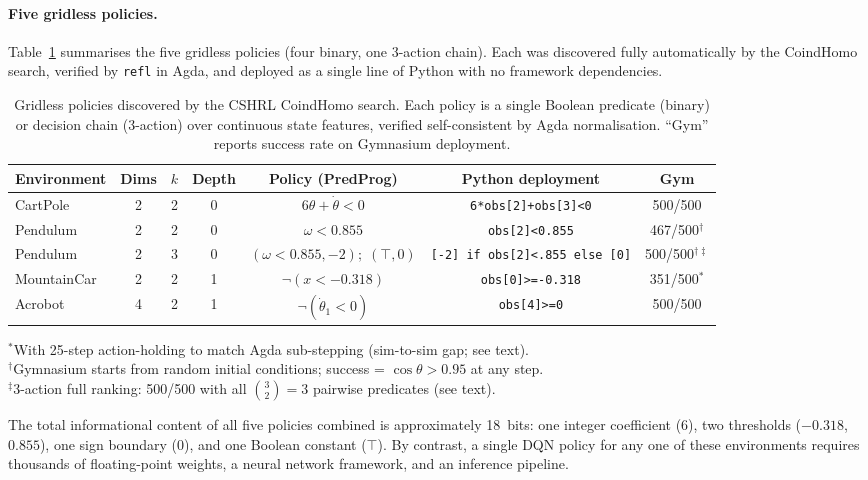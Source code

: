 \documentclass[9pt,a4paper]{article}
\theoremstyle{plain}
\theoremstyle{definition}
\theoremstyle{remark}
\begin{document}
\paragraph{Five gridless policies.}
Table~\ref{tab:gridless-policies} summarises the five gridless policies (four binary, one 3-action chain).  Each was discovered fully automatically by the CoindHomo search, verified by \texttt{refl} in Agda, and deployed as a single line of Python with no framework dependencies.

\begin{table}[h]
\centering
\small
\caption{Gridless policies discovered by the CSHRL CoindHomo search.  Each policy is a single Boolean predicate (binary) or decision chain (3-action) over continuous state features, verified self-consistent by Agda normalisation.  ``Gym'' reports success rate on Gymnasium deployment.}
\label{tab:gridless-policies}
\begin{tabular}{@{}lcccccc@{}}
\toprule
\textbf{Environment} & \textbf{Dims} & $k$ & \textbf{Depth} & \textbf{Policy (PredProg)} & \textbf{Python deployment} & \textbf{Gym} \\
\midrule
CartPole & 2 & 2 & 0 & $6\theta + \dot\theta < 0$ & \verb|6*obs[2]+obs[3]<0| & 500/500 \\
Pendulum & 2 & 2 & 0 & $\omega < 0.855$ & \verb|obs[2]<0.855| & 467/500$^\dagger$ \\
Pendulum & 2 & 3 & 0 & $(\omega < 0.855, {-}2);\; (\top, 0)$ & \verb|[-2] if obs[2]<.855 else [0]| & 500/500$^{\dagger\ddagger}$ \\
MountainCar & 2 & 2 & 1 & $\lnot(x < {-}0.318)$ & \verb|obs[0]>=-0.318| & 351/500$^*$ \\
Acrobot & 4 & 2 & 1 & $\lnot(\dot\theta_1 < 0)$ & \verb|obs[4]>=0| & 500/500 \\
\bottomrule
\end{tabular}

\smallskip
{\footnotesize ${}^*$With 25-step action-holding to match Agda sub-stepping (sim-to-sim gap; see text).\\
${}^\dagger$Gymnasium starts from random initial conditions; success = $\cos\theta > 0.95$ at any step.\\
${}^\ddagger$3-action full ranking: 500/500 with all $\binom{3}{2}=3$ pairwise predicates (see text).}
\end{table}

\noindent The total informational content of all five policies combined is approximately 18~bits: one integer coefficient (6), two thresholds ($-0.318$, $0.855$), one sign boundary (0), and one Boolean constant ($\top$).  By contrast, a single DQN policy for any one of these environments requires thousands of floating-point weights, a neural network framework, and an inference pipeline.
\end{document}
